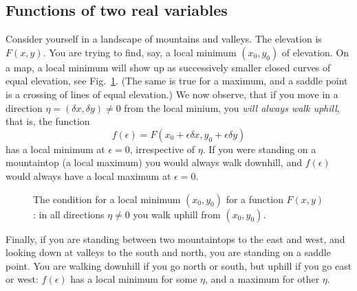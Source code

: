 \subsection{Functions of two real variables}

Consider yourself in a landscape of mountains and valleys. The
elevation is $F(x,y)$. You are trying to find, say, a local minimum
$(x_0,y_0)$ of elevation. On a map, a local minimum will show up as
successively smaller closed curves of equal elevation, see
Fig.~\ref{fig:extrema-2}. (The same is true for a maximum, and a saddle
point is a crossing of lines of equal elevation.) We now observe, that
if you move in a direction $\eta = (\delta x, \delta y) \neq 0$ from the
local minium, you
\emph{will always walk uphill}, that is, the function
\[ f(\epsilon) = F(x_0 + \epsilon \delta x, y_0 + \epsilon \delta
y) \]
has a local minimum at $\epsilon=0$, irrespective of $\eta$.
If you were standing on a mountaintop (a local maximum) you
would always walk downhill, and $f(\epsilon)$ would always have a
local maximum at $\epsilon=0$. 

\begin{figure}
  \begin{center}
    
    \caption{The condition for a local minimum $(x_0,y_0)$ for a
      function $F(x,y)$: in all directions $\eta\neq 0$ you walk uphill
      from $(x_0,y_0)$.\label{fig:extrema-2}}
  \end{center}
\end{figure}

Finally, if you are standing
between two mountaintops to the east and west, and looking down at
valleys to the south and north, you are standing on a saddle point. You are
walking downhill if you go north or south, but uphill if you go east
or west: $f(\epsilon)$ has a local minimum for some $\eta$, and a
maximum for other $\eta$.

